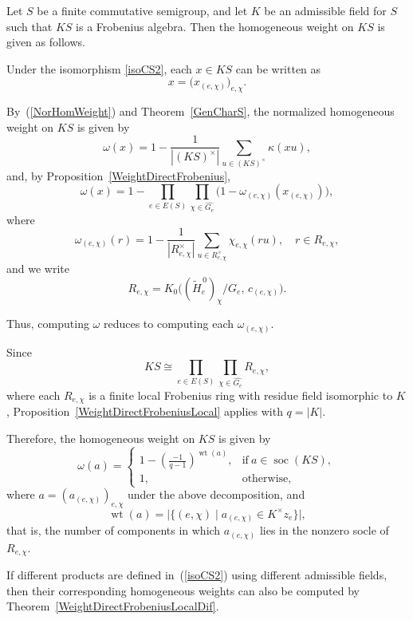 \documentclass[11pt,reqno]{amsart}
\theoremstyle{plain}
\theoremstyle{remark}
\theoremstyle{definition}
\newcommand{\soc}{\mathop{\mathrm{soc}}\nolimits}
\begin{document}
Let $S$ be a finite commutative semigroup, and let $K$ be an admissible field for $S$ such that $KS$ is a Frobenius algebra. Then the homogeneous weight on $KS$ is given as follows.

Under the isomorphism \eqref{isoCS2}, each $x \in KS$ can be written as
\[
x = \bigl(x_{(e,\chi)}\bigr)_{e,\chi}.
\]

By~(\ref{NorHomWeight}) and Theorem~\ref{GenCharS}, the normalized homogeneous weight on $KS$ is given by
\[
\omega(x)
=
1 - \frac{1}{|(KS)^\times|} \sum_{u \in (KS)^\times} \kappa(xu),
\]
and, by Proposition~\ref{WeightDirectFrobenius},
\[
\omega(x)
=
1 - \prod_{e \in E(S)} \prod_{\chi \in \widehat{G_e}} 
\bigl(1 - \omega_{(e,\chi)}(x_{(e,\chi)})\bigr),
\]
where
\[
\omega_{(e,\chi)}(r)
=
1 - \frac{1}{|R_{e,\chi}^\times|} \sum_{u \in R_{e,\chi}^\times} \chi_{e,\chi}(ru),
\quad r \in R_{e,\chi},
\]
and we write
\[
R_{e,\chi} = K_0\bigl((\widetilde{H}_e^{\,0})_{\chi}/G_e,\, c_{(e,\chi)}\bigr).
\]

Thus, computing $\omega$ reduces to computing each $\omega_{(e,\chi)}$.

Since
\[
KS \cong \prod_{e \in E(S)} \prod_{\chi \in \widehat{G_e}} R_{e,\chi},
\]
where each $R_{e,\chi}$ is a finite local Frobenius ring with residue field isomorphic to $K$, Proposition~\ref{WeightDirectFrobeniusLocal} applies with $q = |K|$.

Therefore, the homogeneous weight on $KS$ is given by
\[
\omega(a)
=
\begin{cases}
\displaystyle
1 - \left(\frac{-1}{q-1}\right)^{\operatorname{wt}(a)},
& \text{if}\ a \in \soc(KS), \\[1.2ex]
1, & \text{otherwise},
\end{cases}
\]
where $a = (a_{(e,\chi)})_{e,\chi}$ under the above decomposition, and
\[
\operatorname{wt}(a)
=
\bigl|\{(e,\chi) \mid a_{(e,\chi)} \in K^\times z_{e}\}\bigr|,
\]
that is, the number of components in which $a_{(e,\chi)}$ lies in the nonzero socle of $R_{e,\chi}$.

If different products are defined in~(\ref{isoCS2}) using different admissible fields, then their corresponding homogeneous weights can also be computed by Theorem~\ref{WeightDirectFrobeniusLocalDif}.

\end{document}
